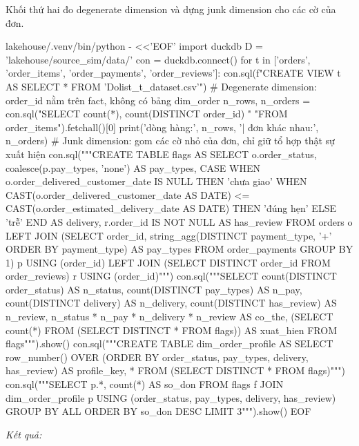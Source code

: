 Khối thứ hai đo degenerate dimension và dựng junk dimension cho các cờ của đơn.

\begin{codeblock}
lakehouse/.venv/bin/python - <<'EOF'
import duckdb
D = 'lakehouse/source_sim/data/'
con = duckdb.connect()
for t in ['orders', 'order_items', 'order_payments', 'order_reviews']:
    con.sql(f"CREATE VIEW {t} AS SELECT * FROM '{D}olist_{t}_dataset.csv'")
# Degenerate dimension: order_id nằm trên fact, không có bảng dim_order
n_rows, n_orders = con.sql("SELECT count(*), count(DISTINCT order_id) "
                           "FROM order_items").fetchall()[0]
print('dòng hàng:', n_rows, '| đơn khác nhau:', n_orders)
# Junk dimension: gom các cờ nhỏ của đơn, chỉ giữ tổ hợp thật sự xuất hiện
con.sql("""CREATE TABLE flags AS
  SELECT o.order_status,
         coalesce(p.pay_types, 'none') AS pay_types,
         CASE WHEN o.order_delivered_customer_date IS NULL THEN 'chưa giao'
              WHEN CAST(o.order_delivered_customer_date AS DATE)
                   <= CAST(o.order_estimated_delivery_date AS DATE) THEN 'đúng hẹn'
              ELSE 'trễ' END AS delivery,
         r.order_id IS NOT NULL AS has_review
  FROM orders o
  LEFT JOIN (SELECT order_id, string_agg(DISTINCT payment_type, '+'
                    ORDER BY payment_type) AS pay_types
             FROM order_payments GROUP BY 1) p USING (order_id)
  LEFT JOIN (SELECT DISTINCT order_id FROM order_reviews) r USING (order_id)""")
con.sql("""SELECT count(DISTINCT order_status) AS n_status,
                  count(DISTINCT pay_types)    AS n_pay,
                  count(DISTINCT delivery)     AS n_delivery,
                  count(DISTINCT has_review)   AS n_review,
                  n_status * n_pay * n_delivery * n_review AS co_the,
                  (SELECT count(*) FROM (SELECT DISTINCT * FROM flags)) AS xuat_hien
           FROM flags""").show()
con.sql("""CREATE TABLE dim_order_profile AS
  SELECT row_number() OVER (ORDER BY order_status, pay_types, delivery, has_review)
           AS profile_key, *
  FROM (SELECT DISTINCT * FROM flags)""")
con.sql("""SELECT p.*, count(*) AS so_don FROM flags f
           JOIN dim_order_profile p
             USING (order_status, pay_types, delivery, has_review)
           GROUP BY ALL ORDER BY so_don DESC LIMIT 3""").show()
EOF
\end{codeblock}
\textit{Kết quả:}
